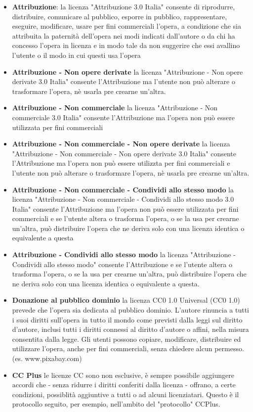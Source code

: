 \begin{itemize}
    \item \textbf{Attribuzione}: la licenza "Attribuzione 3.0 Italia" consente di riprodurre, distribuire, comunicare al pubblico,
    esporre in pubblico, rappresentare, eseguire, modificare, usare per fini commerciali l'opera, a condizione che sia
    attribuita la paternità dell'opera nei modi indicati dall'autore o da chi ha concesso l'opera in licenza e in modo tale da non suggerire che essi avallino l'utente
    o il modo in cui questi usa l'opera
    \item \textbf{Attribuzione - Non opere derivate} la licenza "Attribuzione - Non opere derivate 3.0 Italia" consente l'Attribuzione ma l'utente non
    può alterare o trasformare l'opera, nè usarla pre crearne un'altra.
    \item \textbf{Attribuzione - Non commerciale} la licenza "Attribuzione - Non commerciale 3.0 Italia" consente l'Attribuzione ma l'opera non può essere utilizzata
    per fini commerciali
    \item \textbf{Attribuzione - Non commerciale - Non opere derivate} la licenza "Attribuzione - Non commerciale - Non opere derivate 3.0 Italia" consente l'Attribuzione ma l'opera non
    può essere utilizzta per fini commerciali e l'utente non può alterare o trasformare l'opera, nè usarla pre crearne un'altra.
    \item \textbf{Attribuzione - Non commerciale - Condividi allo stesso modo} la licenza "Attribuzione - Non commerciale - Condividi allo stesso modo 3.0 Italia" consente l'Attribuzione ma
    l'opera non può essere utilizzata per fini commerciali e se l'utente altera o trasforma l'opera, o se la usa per crearne un'altra, può distribuire l'opera
    che ne deriva solo con una licenza identica o equivalente a questa
    \item \textbf{Attribuzione - Condividi allo stesso modo} la licenza "Attribuzione - Condividi allo stesso modo" consente l'Attribuzione e se l'utente altera o trasforma l'opera, o se la
    usa per crearne un'altra, può distribuire l'opera che ne deriva solo con una licenza identica o equivalente a questa.
    \item \textbf{Donazione al pubblico dominio} la licenza CC0 1.0 Universal (CC0 1.0) prevede che l'opera sia dedicata al pubblico dominio. \newline
    L'autore rinuncia a tutti i suoi diritti sull'opera in tutto il mondo come previsti dalla leggi sul diritto d'autore, inclusi tutti i diritti connessi
    al diritto d'autore o affini, nella misura consentita dalla legge.\newline
    Gli utenti possono copiare, modificare, distribuire ed utilizzare l'opera, anche per fini commerciali, senza chiedere
    alcun permesso. (es. www.pixabay.com)
    \item \textbf{CC Plus} le licenze CC sono non esclusive, è sempre possibile aggiungere accordi che - senza ridurre i diritti conferiti dalla licenza - offrano, a certe
    condizioni, possiblità aggiuntive a tutti o ad alcuni licenziatari. Questo è il protocollo seguito, per esempio, nell'ambito del "protocollo" CCPlus.
\end{itemize}
